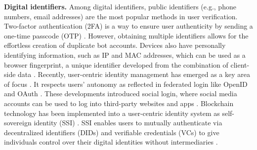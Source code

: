 \textbf{Digital identifiers.}
Among digital identifiers, public identifiers (e.g., phone numbers, email addresses) are the most popular methods in user verification. %
Two-factor authentication (2FA) is a way to ensure user authenticity by sending a one-time passcode (OTP) %
\cite{aloul2009two, sharma2024can}. However, 
obtaining multiple identifiers allows for the effortless creation of duplicate bot accounts. Devices also have personally identifying information, such as IP and MAC addresses, which can be used as a browser fingerprint, a unique identifier developed from the combination of client-side data \cite{laperdrix2020browser,zhang2022survey}. Recently, user-centric identity management has emerged as a key area of focus \cite{ahn2009privacy}. It respects users' autonomy as reflected in federated login like OpenID and OAuth \cite{recordon2006openid, hardt2012oauth, li2020user}. These developments introduced %
social login, where social media accounts can be used to log into third-party websites and apps \cite{gafni2014social}. Blockchain technology has been implemented into a user-centric identity system as self-sovereign identity (SSI) \cite{toth2019self}. %
SSI enables users to mutually authenticate via decentralized identifiers (DIDs) and verifiable credentials (VCs) to give individuals control over their digital identities without intermediaries \cite{muhle2018survey, brunner2020did}.

